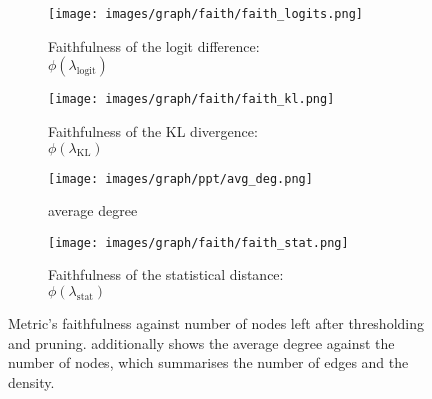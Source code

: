 \documentclass{article}
\begin{document}
\begin{figure}[h]
    \centering
    \begin{subfigure}{0.4\linewidth}
        \centering
        \texttt{[image: images/graph/faith/faith\_logits.png]}
        \caption{Faithfulness of the logit difference:\\$\phi(\lambda_{\mathrm{logit}})$}
    \end{subfigure}
    \hspace{1em}
    \begin{subfigure}{0.4\linewidth}
        \centering
        \texttt{[image: images/graph/faith/faith\_kl.png]}
        \caption{Faithfulness of the KL divergence:\\$\phi(\lambda_{\mathrm{KL}})$}
    \end{subfigure}
    \hfill
    \vspace{1em}
    \begin{subfigure}{0.38\linewidth}
        \centering
        \texttt{[image: images/graph/ppt/avg\_deg.png]}
        \caption{average degree}
        \label{fig:avg_deg}
    \end{subfigure}
    \hfill
    \begin{subfigure}{0.55\linewidth}
        \centering
        \texttt{[image: images/graph/faith/faith\_stat.png]}
        \caption{Faithfulness of the statistical distance:\\$\phi(\lambda_{\mathrm{stat}})$}
    \end{subfigure}
    \hfill
    \caption{Metric's faithfulness against number of nodes left after thresholding and pruning.  additionally shows the average degree against the number of nodes, which summarises the number of edges and the density.}
    \label{fig:faithfulness}
\end{figure}
\end{document}
